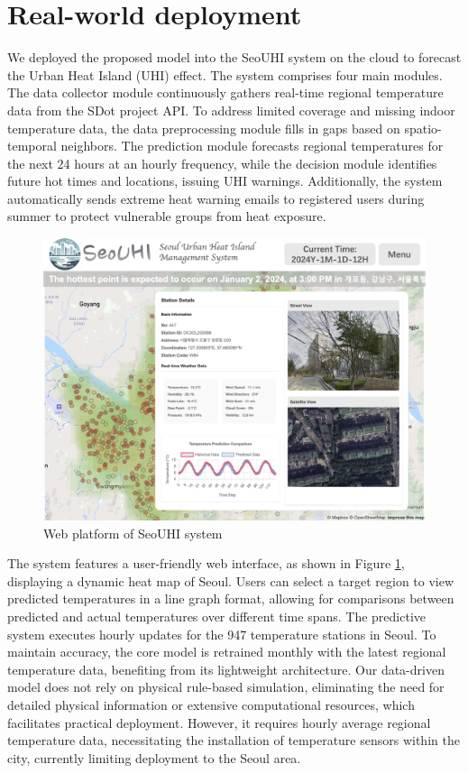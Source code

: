 \vspace{-0.5em}
\section{Real-world deployment}
We deployed the proposed model into the SeoUHI system on the cloud to forecast the Urban Heat Island (UHI) effect. The system comprises four main modules. The data collector module continuously gathers real-time regional temperature data from the SDot project API. To address limited coverage and missing indoor temperature data, the data preprocessing module fills in gaps based on spatio-temporal neighbors. The prediction module forecasts regional temperatures for the next 24 hours at an hourly frequency, while the decision module identifies future hot times and locations, issuing UHI warnings. Additionally, the system automatically sends extreme heat warning emails to registered users during summer to protect vulnerable groups from heat exposure.

\begin{figure}[!b]
\centering
\vspace{-1em}
\includegraphics[width=1.0\linewidth]{resources/deploy.png}
\vspace{-2em}
\caption{Web platform of SeoUHI system}
\label{fig:depoly}
\end{figure}

The system features a user-friendly web interface, as shown in Figure \ref{fig:depoly}, displaying a dynamic heat map of Seoul. Users can select a target region to view predicted temperatures in a line graph format, allowing for comparisons between predicted and actual temperatures over different time spans. The predictive system executes hourly updates for the 947 temperature stations in Seoul. To maintain accuracy, the core model is retrained monthly with the latest regional temperature data, benefiting from its lightweight architecture. Our data-driven model does not rely on physical rule-based simulation, eliminating the need for detailed physical information or extensive computational resources, which facilitates practical deployment. However, it requires hourly average regional temperature data, necessitating the installation of temperature sensors within the city, currently limiting deployment to the Seoul area.